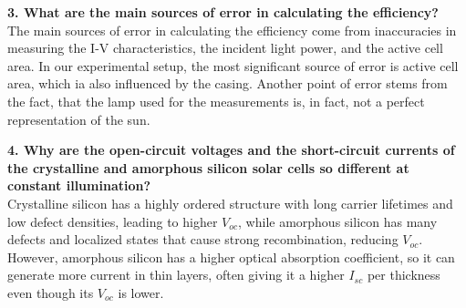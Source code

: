 \textbf{3. What are the main sources of error in calculating the efficiency?}\\
The main sources of error in calculating the efficiency come from inaccuracies in measuring the 
I-V characteristics, the incident light power, and the active cell area. In our experimental setup,
the most significant source of error is active cell area, which ia also influenced by the casing. Another 
point of error stems from the fact, that the lamp used for the measurements is, in fact, not a perfect 
representation of the sun.

\textbf{4. Why are the open-circuit voltages and the short-circuit currents of the crystalline and amorphous 
silicon solar cells so different at constant illumination?}\\
Crystalline silicon has a highly ordered structure with long carrier lifetimes and low defect densities, 
leading to higher $V_{oc}$, while amorphous silicon has many defects and localized states that cause strong 
recombination, reducing $V_{oc}$. However, amorphous silicon has a higher optical absorption coefficient, 
so it can generate more current in thin layers, often giving it a higher $I_{sc}$ per thickness even though its 
$V_{oc}$ is lower.